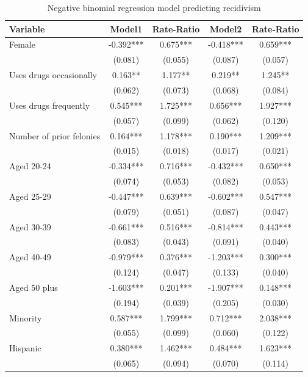 \begin{table}[htbp]\centering
 \caption{Negative binomial regression model predicting recidivism \label{tab:recdnb}}
 \begin{tabular}{lcccc}
\hline
Variable      &    Model1 & Rate-Ratio &    Model2 & Rate-Ratio  \\
\hline
Female   &   -0.392***&    0.675***&   -0.418***&    0.659***\\
      &   (0.081)  &   (0.055)  &   (0.087)  &   (0.057)  \\
Uses drugs occasionally   &    0.163** &    1.177** &    0.219** &    1.245** \\
      &   (0.062)  &   (0.073)  &   (0.068)  &   (0.084)  \\
Uses drugs frequently   &    0.545***&    1.725***&    0.656***&    1.927***\\
      &   (0.057)  &   (0.099)  &   (0.062)  &   (0.120)  \\
Number of prior felonies    &    0.164***&    1.178***&    0.190***&    1.209***\\
      &   (0.015)  &   (0.018)  &   (0.017)  &   (0.021)  \\
Aged 20-24   &   -0.334***&    0.716***&   -0.432***&    0.650***\\
      &   (0.074)  &   (0.053)  &   (0.082)  &   (0.053)  \\
Aged 25-29   &   -0.447***&    0.639***&   -0.602***&    0.547***\\
      &   (0.079)  &   (0.051)  &   (0.087)  &   (0.047)  \\
Aged 30-39   &   -0.661***&    0.516***&   -0.814***&    0.443***\\
      &   (0.083)  &   (0.043)  &   (0.091)  &   (0.040)  \\
Aged 40-49   &   -0.979***&    0.376***&   -1.203***&    0.300***\\
      &   (0.124)  &   (0.047)  &   (0.133)  &   (0.040)  \\
Aged 50 plus   &   -1.603***&    0.201***&   -1.907***&    0.148***\\
      &   (0.194)  &   (0.039)  &   (0.205)  &   (0.030)  \\
Minority    &    0.587***&    1.799***&    0.712***&    2.038***\\
      &   (0.055)  &   (0.099)  &   (0.060)  &   (0.122)  \\
Hispanic     &    0.380***&    1.462***&    0.484***&    1.623***\\
      &   (0.065)  &   (0.094)  &   (0.070)  &   (0.114)  \\

\end{tabular}
\end{table}
